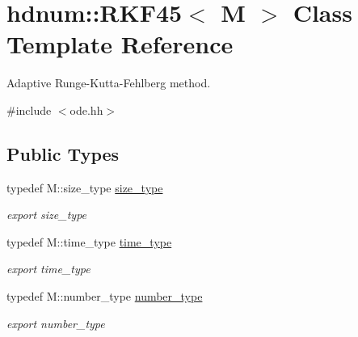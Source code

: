 \hypertarget{classhdnum_1_1RKF45}{
\section{hdnum::RKF45$<$ M $>$ Class Template Reference}
\label{classhdnum_1_1RKF45}
}


Adaptive Runge-\/Kutta-\/Fehlberg method.  




{\ttfamily \#include $<$ode.hh$>$}

\subsection*{Public Types}
\begin{DoxyCompactItemize}
\item 
\hypertarget{classhdnum_1_1RKF45_a7fd97c231601ffb9373fbb5dad8a60f3}{
typedef M::size\_\-type \hyperlink{classhdnum_1_1RKF45_a7fd97c231601ffb9373fbb5dad8a60f3}{size\_\-type}}
\label{classhdnum_1_1RKF45_a7fd97c231601ffb9373fbb5dad8a60f3}

\begin{DoxyCompactList}\small\item\em export size\_\-type \item\end{DoxyCompactList}\item 
\hypertarget{classhdnum_1_1RKF45_a27ab73a7d7756f59d4422a96afd9ea00}{
typedef M::time\_\-type \hyperlink{classhdnum_1_1RKF45_a27ab73a7d7756f59d4422a96afd9ea00}{time\_\-type}}
\label{classhdnum_1_1RKF45_a27ab73a7d7756f59d4422a96afd9ea00}

\begin{DoxyCompactList}\small\item\em export time\_\-type \item\end{DoxyCompactList}\item 
\hypertarget{classhdnum_1_1RKF45_af34f11a4cdc46bb0323db78fcb3712da}{
typedef M::number\_\-type \hyperlink{classhdnum_1_1RKF45_af34f11a4cdc46bb0323db78fcb3712da}{number\_\-type}}
\label{classhdnum_1_1RKF45_af34f11a4cdc46bb0323db78fcb3712da}

\begin{DoxyCompactList}\small\item\em export number\_\-type \item\end{DoxyCompactList}\end{DoxyCompactItemize}
